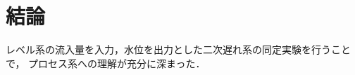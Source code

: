 \documentclass[11pt,a4paper]{jsarticle}
\begin{document}
%
%
%
%

\section{結論}

レベル系の流入量を入力，水位を出力とした二次遅れ系の同定実験を行うことで，
プロセス系への理解が充分に深まった．
\end{document}
